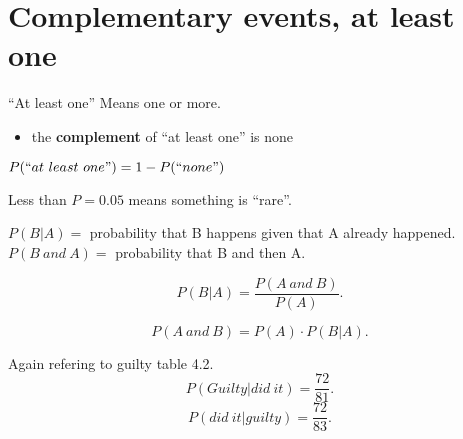\section{Complementary events, at least one}

``At least one'' Means one or more.
\begin{itemize}
    \item the \textbf{complement} of ``at least one'' is none
\end{itemize}
$P(``at \ least \ one") = 1-P(``none")$


Less than $P=0.05$ means something is ``rare''.

$P(B|A)=$ probability that B happens given that A already happened.
$P(B \ and \ A)=$ probability that B and then A.

\[ P(B|A)=\frac{P(A \ and \ B)}{P(A)} .\] 

\[ P(A \ and \ B) = P(A) \cdot P(B|A) .\] 


Again refering to guilty table 4.2.
\[ P(Guilty|did\ it)= \frac{72}{81} .\] 
\[ P(did\ it|guilty) = \frac{72}{83} .\] 



